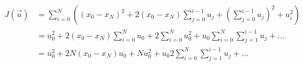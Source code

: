 \documentclass{article}
\begin{document}
\thispagestyle{empty}

\begin{align*}
J(\vec{u}) & = \sum\limits_{i=0}^N \left((x_0-x_N)^2 + 2(x_0-x_N)\sum\limits_{j=0}^{i-1}u_j+\left(\sum\limits_{j=0}^{i-1}u_j\right)^2 + u_i^2\right)\\
& = u_0^2 + 2(x_0-x_N)\sum\limits_{i=0}^N u_0 +  2\sum\limits_{i=0}^N u_0^2 + u_0 \sum\limits_{i=0}^N \sum\limits_{j=1}^{i-1}u_j + \dots\\
& = u_0^2 + 2N(x_0-x_N) u_0 + N u_0^2 +  u_0  2\sum\limits_{i=0}^N \sum\limits_{j=1}^{i-1}u_j + \dots
\end{align*}
\end{document}
